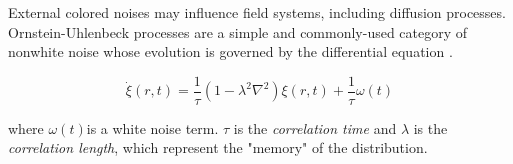External colored noises may influence field systems, including diffusion
processes. Ornstein-Uhlenbeck processes are a simple and commonly-used
category of nonwhite noise whose evolution is governed by the
differential equation \cite{ojalvoColoredNoise}.

\[\dot{\xi}(r,t) = \frac{1}{\tau}(1 - \lambda^{2}\nabla^{2})\xi(r,t) + \frac{1}{\tau}\omega(t)\]

where \(\omega(t)\)is a white noise term. \(\tau\) is the
\emph{correlation time} and \(\lambda\) is the \emph{correlation length}, which represent the "memory" of the distribution.